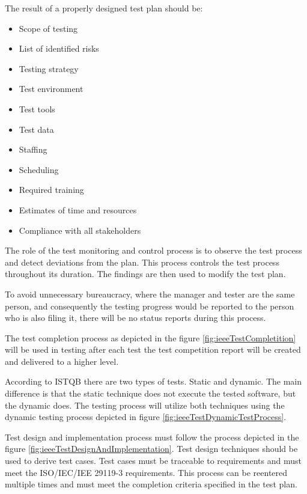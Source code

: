 The result of a properly designed test plan should be:
\begin{itemize}
    \item Scope of testing
    \item List of identified risks
    \item Testing strategy
    \item Test environment
    \item Test tools
    \item Test data
    \item Staffing
    \item Scheduling
    \item Required training
    \item Estimates of time and resources
    \item Compliance with all stakeholders
\end{itemize}

The role of the test monitoring and control process is to observe the test process and detect deviations from the plan. This process controls the test process throughout its duration. The findings are then used to modify the test plan.

To avoid unnecessary bureaucracy, where the manager and tester are the same person, and consequently the testing progress would be reported to the person who is also filing it, there will be no status reports during this process.

The test completion process as depicted in the figure \ref{fig:ieeeTestCompletition} will be used in testing after each test the test competition report will be created and delivered to a higher level.


According to ISTQB \cite{FoundationOfSoftwareTesting} there are two types of tests. Static and dynamic. The main difference is that the static technique does not execute the tested software, but the dynamic does. The testing process will utilize both techniques using the dynamic testing process depicted in figure \ref{fig:ieeeTestDynamicTestProcess}.


Test design and implementation process must follow the process depicted in the figure \ref{fig:ieeeTestDesignAndImplementation}. Test design techniques should be used to derive test cases. Test cases must be traceable to requirements and must meet the ISO/IEC/IEE 29119-3 requirements. This process can be reentered multiple times and must meet the completion criteria specified in the test plan.


